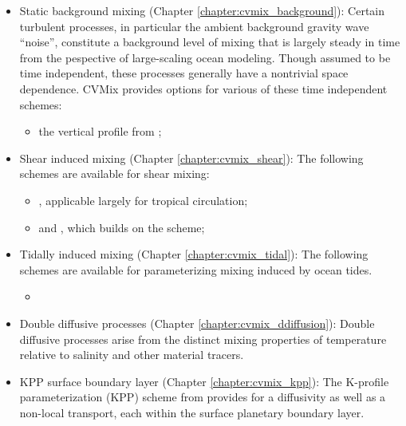\begin{itemize}

\item {\sc Static background mixing} (Chapter
  \ref{chapter:cvmix_background}): Certain turbulent processes, in
  particular the ambient background gravity wave ``noise'', constitute
  a background level of mixing that is largely steady in time from the
  pespective of large-scaling ocean modeling.  Though assumed to be
  time independent, these processes generally have a nontrivial space
  dependence.  CVMix provides options for various of these time
  independent schemes:
\begin{itemize}
\item the vertical profile from \cite{BryanLewis1979};
\end{itemize}


\item {\sc Shear induced mixing} (Chapter \ref{chapter:cvmix_shear}):
  The following schemes are available for shear mixing:
 \begin{itemize}
 \item \cite{PPvmix}, applicable largely for tropical circulation;
 \item \cite{LargeKPP} and \cite{Large_Gent1999}, which builds on the
   \cite{PPvmix} scheme;
  \end{itemize}


\item {\sc Tidally induced mixing} (Chapter
  \ref{chapter:cvmix_tidal}): The following schemes are available for
  parameterizing mixing induced by ocean tides.
  \begin{itemize}
   \item \cite{Simmonsetal2004} 
\end{itemize}


\item {\sc Double diffusive processes} (Chapter
  \ref{chapter:cvmix_ddiffusion}): Double diffusive processes arise
  from the distinct mixing properties of temperature relative to
  salinity and other material tracers.

\item {\sc KPP surface boundary layer} (Chapter
  \ref{chapter:cvmix_kpp}): The K-profile parameterization (KPP)
  scheme from \cite{LargeKPP} provides for a diffusivity as well as a
  non-local transport, each within the surface planetary boundary
  layer.


\end{itemize}
